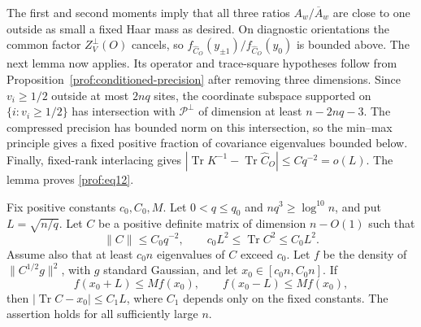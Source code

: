 The first and second moments imply that all three ratios
$A_w/\overline A_w$ are close to one outside as small a fixed Haar
mass as desired. On diagnostic orientations the common factor
$Z_V^\perp(O)$ cancels, so
$f_{\widehat C_O}(y_{\pm1})/f_{\widehat C_O}(y_0)$ is bounded above.
The next lemma now applies. Its operator and trace-square hypotheses
follow from Proposition~\ref{prof:conditioned-precision} after removing
three dimensions. Since $v_i\ge1/2$ outside at most $2nq$ sites, the
coordinate subspace supported on $\{i:v_i\ge1/2\}$ has intersection
with $\mathcal P^\perp$ of dimension at least $n-2nq-3$. The compressed
precision has bounded norm on this intersection, so the min--max principle
gives a fixed positive fraction of covariance eigenvalues bounded below.
Finally, fixed-rank interlacing gives
$|\operatorname{Tr}K^{-1}-\operatorname{Tr}\widehat C_O|
\le Cq^{-2}=o(L)$. The lemma proves \eqref{prof:eq12}.

\begin{lemma}
\label{prof:trace-from-three-densities}
Fix positive constants $c_0,C_0,M$. Let $0<q\le q_0$ and
$nq^3\ge\log^{10}n$, and put $L=\sqrt{n/q}$. Let $C$ be a positive
definite matrix of dimension $n-O(1)$ such that
\[
 \|C\|\le C_0q^{-2},\qquad
 c_0L^2\le\operatorname{Tr}C^2\le C_0L^2.
\]
Assume also that at least $c_0n$ eigenvalues of $C$ exceed $c_0$.
Let $f$ be the density of $\|C^{1/2}g\|^2$, with $g$ standard Gaussian,
and let $x_0\in[c_0n,C_0n]$. If
\[
 f(x_0+L)\le M f(x_0),\qquad
 f(x_0-L)\le M f(x_0),
\]
then $|\operatorname{Tr}C-x_0|\le C_1L$, where $C_1$ depends only on
the fixed constants. The assertion holds for all sufficiently large $n$.
\end{lemma}

